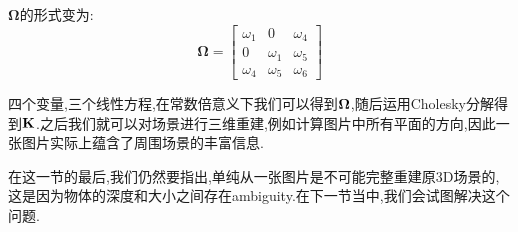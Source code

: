 $\bm \Omega$的形式变为:
\begin{equation}
	\bm \Omega = 
	\begin{bmatrix}
		\omega_1 & 0 & \omega_4
		\\
		0 & \omega_1 & \omega_5
		\\
		\omega_4 & \omega_5 & \omega_6
	\end{bmatrix}
\end{equation}

四个变量,三个线性方程,在常数倍意义下我们可以得到$\bold{\Omega}$,随后运用Cholesky分解得到$\bold{K}$.之后我们就可以对场景进行三维重建,例如计算图片中所有平面的方向,因此一张图片实际上蕴含了周围场景的丰富信息.

在这一节的最后,我们仍然要指出,单纯从一张图片是不可能完整重建原3D场景的,这是因为物体的深度和大小之间存在ambiguity.在下一节当中,我们会试图解决这个问题.